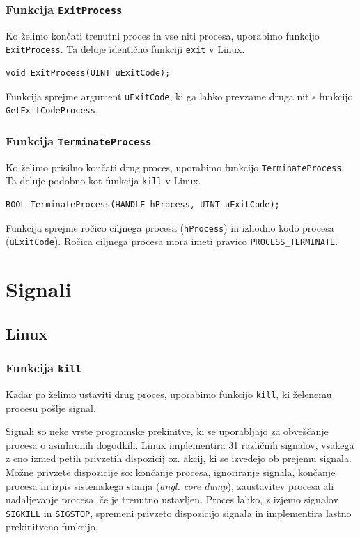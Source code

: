 \documentclass[a4paper,12pt,openright]{book}
\begin{document}
\subsubsection{Funkcija \texttt{ExitProcess}}

Ko želimo končati trenutni proces in vse niti procesa, uporabimo funkcijo \texttt{ExitProcess}.
Ta deluje identično funkciji \texttt{exit} v Linux.

\begin{lstlisting}[style=func]
 void ExitProcess(UINT uExitCode);
\end{lstlisting}

Funkcija sprejme argument \texttt{uExitCode}, ki ga lahko prevzame druga nit s funkcijo \texttt{GetExitCodeProcess}.

\subsubsection{Funkcija \texttt{TerminateProcess}}

Ko želimo prisilno končati drug proces, uporabimo funkcijo \texttt{TerminateProcess}.
Ta deluje podobno kot funkcija \texttt{kill} v Linux.

\begin{lstlisting}[style=func]
 BOOL TerminateProcess(HANDLE hProcess, UINT uExitCode);
\end{lstlisting}

Funkcija sprejme ročico ciljnega procesa (\texttt{hProcess}) in izhodno kodo procesa (\texttt{uExitCode}).
Ročica ciljnega procesa mora imeti pravico \texttt{PROCESS\-\_TERMINATE}.

\section{Signali}

\subsection{Linux}

\subsubsection{Funkcija \texttt{kill}}

Kadar pa želimo ustaviti drug proces, uporabimo funkcijo \texttt{kill}, ki želenemu procesu pošlje signal.

Signali so neke vrste programske prekinitve, ki se uporabljajo za obveščanje procesa o asinhronih dogodkih. %
Linux implementira 31 različnih signalov, vsakega z eno izmed petih privzetih dispozicij oz. akcij, ki se izvedejo ob prejemu signala.
Možne privzete dispozicije so: končanje procesa, ignoriranje signala, končanje procesa in izpis sistemskega stanja (\textit{angl. core dump}), zaustavitev procesa ali nadaljevanje procesa, če je trenutno ustavljen.
Proces lahko, z izjemo signalov \texttt{SIGKILL} in \texttt{SIGSTOP}, spremeni privzeto dispozicijo signala in implementira lastno prekinitveno funkcijo.
\end{document}
